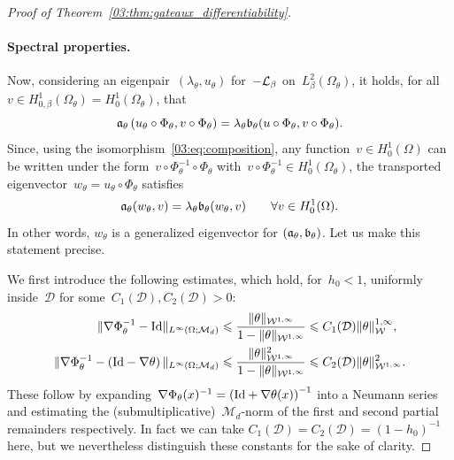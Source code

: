 \begin{proof}[Proof of Theorem~\ref{03:thm:gateaux_differentiability}]
    \paragraph{Spectral properties.}
    Now, considering an eigenpair~$(\lambda_\theta,u_\theta)$ for~$-\mathcal{L}_\beta$ on~$L^2_\beta(\Omega_\theta)$, it holds, for all~$v\in H_{0,\beta}^1(\Omega_\theta)=H_0^1(\Omega_\theta)$, that
    \[\mathfrak{a}_\theta\left(u_\theta\circ\Phi_\theta,v\circ\Phi_\theta\right) = \lambda_\theta \mathfrak{b}_\theta(u\circ\Phi_\theta,v\circ\Phi_\theta).\]
    Since, using the isomorphism~\eqref{03:eq:composition}, any function~$v\in H_0^1(\Omega)$ can be written under the form~$v\circ \Phi_{\theta}^{-1}\circ \Phi_\theta$ with~$v\circ\Phi_{\theta}^{-1}\in H_0^1(\Omega_\theta)$, the transported eigenvector~$w_\theta = u_\theta\circ \Phi_\theta$ satisfies
    \begin{equation}
        \mathfrak{a}_\theta(w_\theta,v) = \lambda_\theta \mathfrak{b}_\theta(w_\theta,v)\qquad \forall v\in H_0^1(\Omega).
    \end{equation}
    In other words, $w_\theta$ is a generalized eigenvector for $(\mathfrak{a}_\theta,\mathfrak{b}_\theta)$. Let us make this statement precise.

    We first introduce the following estimates, which hold, for~$h_0<1$, uniformly inside~$\mathcal D$ for some~$C_1(\mathcal D),C_2(\mathcal D)>0$:
    \begin{equation}
        \label{03:eq:grad_phi_estimates}
        \begin{aligned}
            \|\nabla\Phi_\theta^{-1} - \mathrm{Id}\|_{L^\infty(\Omega;\mathcal M_d)} &\leqslant \frac{\|\theta\|_{{\mathcal{W}}^{1,\infty}}}{1-\|\theta\|_{{\mathcal{W}}^{1,\infty}}} \leqslant C_1(\mathcal D) \|\theta\|_{\mathcal{W}}^{1,\infty},\\
            \|\nabla\Phi_\theta^{-1}-\left(\mathrm{Id}-\nabla \theta\right)\|_{L^\infty(\Omega;\mathcal M_d)}&\leqslant \frac{\|\theta\|^2_{{\mathcal{W}}^{1,\infty}}}{1-\|\theta\|_{{\mathcal{W}}^{1,\infty}}} \leqslant C_2(\mathcal D)\|\theta\|^2_{{\mathcal{W}}^{1,\infty}}.
        \end{aligned}
    \end{equation}
    These follow by expanding~$\nabla\Phi_\theta(x)^{-1}=\left(\mathrm{Id}+\nabla\theta(x)\right)^{-1}$ into a Neumann series and estimating the (submultiplicative)~$\mathcal M_d$-norm of the first and second partial remainders respectively.
    In fact we can take $C_1(\mathcal D)=C_2(\mathcal D)=(1-h_0)^{-1}$ here, but we nevertheless distinguish these constants for the sake of clarity.
    

\end{proof}
